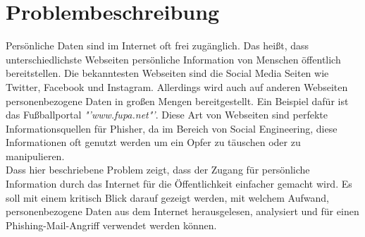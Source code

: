 

\chapter{Problembeschreibung}  %
\label{cha:Problemspezifikation} %
Persönliche Daten sind im Internet oft frei zugänglich. Das heißt, dass unterschiedlichste Webseiten persönliche Information von Menschen öffentlich bereitstellen. Die bekanntesten Webseiten sind die Social Media Seiten wie Twitter, Facebook und Instagram. Allerdings wird auch auf anderen Webseiten personenbezogene Daten in großen Mengen bereitgestellt. Ein Beispiel dafür ist das Fußballportal \textit{"'www.fupa.net"'}. Diese Art von Webseiten sind perfekte Informationsquellen für Phisher, da im Bereich von Social Engineering, diese Informationen oft genutzt werden um ein Opfer zu täuschen oder zu manipulieren.\\
Dass hier beschriebene Problem zeigt, dass der Zugang für persönliche Information durch das Internet für die Öffentlichkeit einfacher gemacht wird. Es soll mit einem kritisch Blick darauf gezeigt werden, mit welchem Aufwand, personenbezogene Daten aus dem Internet herausgelesen, analysiert und für einen Phishing-Mail-Angriff verwendet werden können.
